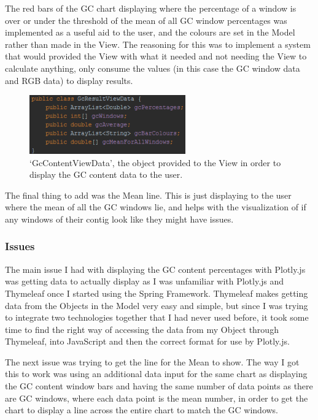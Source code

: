 The red bars of the GC chart displaying where the percentage of a window is over or under the threshold of the mean of all GC window percentages was implemented as a useful aid to the user, and the colours are set in the Model rather than made in the View. The reasoning for this was to implement a system that would provided the View with what it needed and not needing the View to calculate anything, only consume the values (in this case the GC window data and RGB data) to display results.

\begin{figure}[H]
\centering
\includegraphics[width=0.6\textwidth]{images/gcviewdata}
\caption{`GcContentViewData', the object provided to the View in order to display the GC content data to the user.}
\end{figure}

The final thing to add was the Mean line. This is just displaying to the user where the mean of all the GC windows lie, and helps with the visualization of if any windows of their contig look like they might have issues.
\subsubsection{Issues}
The main issue I had with displaying the GC content percentages with Plotly.js was getting data to actually display as I was unfamiliar with Plotly.js and Thymeleaf once I started using the Spring Framework. Thymeleaf makes getting data from the Objects in the Model very easy and simple, but since I was trying to integrate two technologies together that I had never used before, it took some time to find the right way of accessing the data from my Object through Thymeleaf, into JavaScript and then the correct format for use by Plotly.js.

The next issue was trying to get the line for the Mean to show. The way I got this to work was using an additional data input for the same chart as displaying the GC content window bars and having the same number of data points as there are GC windows, where each data point is the mean number, in order to get the chart to display a line across the entire chart to match the GC windows.

